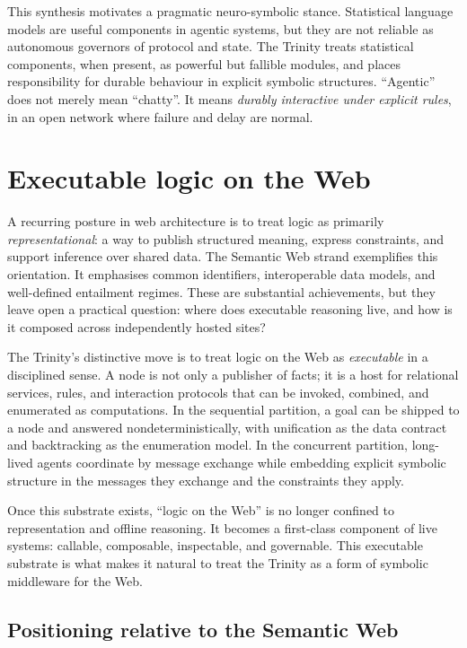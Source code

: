 This synthesis motivates a pragmatic neuro-symbolic stance. Statistical
language models are useful components in agentic systems, but they are
not reliable as autonomous governors of protocol and state. The Trinity
treats statistical components, when present, as powerful but fallible
modules, and places responsibility for durable behaviour in explicit
symbolic structures. ``Agentic'' does not merely mean ``chatty''. It
means \emph{durably interactive under explicit rules}, in an open
network where failure and delay are normal.



\section{Executable logic on the Web}\label{sec:paradigm-executable-logic}

A recurring posture in web architecture is to treat logic as primarily
\emph{representational}: a way to publish structured meaning, express
constraints, and support inference over shared data. The Semantic Web
strand exemplifies this orientation. It emphasises common identifiers,
interoperable data models, and well-defined entailment regimes. These
are substantial achievements, but they leave open a practical question:
where does executable reasoning live, and how is it composed across
independently hosted sites?

The Trinity's distinctive move is to treat logic on the Web as
\emph{executable} in a disciplined sense. A node is not only a publisher
of facts; it is a host for relational services, rules, and interaction
protocols that can be invoked, combined, and enumerated as computations.
In the sequential partition, a goal can be shipped to a node and
answered nondeterministically, with unification as the data contract and
backtracking as the enumeration model. In the concurrent partition,
long-lived agents coordinate by message exchange while embedding
explicit symbolic structure in the messages they exchange and the
constraints they apply.

Once this substrate exists, ``logic on the Web'' is no longer confined
to representation and offline reasoning. It becomes a first-class
component of live systems: callable, composable, inspectable, and
governable. This executable substrate is what makes it natural to treat
the Trinity as a form of symbolic middleware for the Web.


\subsection{Positioning relative to the Semantic Web}\label{sec:paradigm-positioning-sw}

